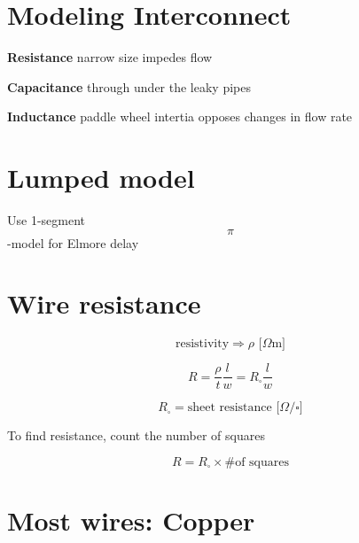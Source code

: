 \section{Modeling Interconnect}\label{modeling-interconnect}

\textbf{Resistance} narrow size impedes flow

\textbf{Capacitance} through under the leaky pipes

\textbf{Inductance} paddle wheel intertia opposes changes in flow rate

\section{Lumped model}\label{lumped-model}

Use 1-segment \[\pi\]-model for Elmore delay

\begin{Shaded}
\begin{Highlighting}[]
\ExtensionTok{{-}{-}{-}/\textbackslash{}/\textbackslash{}/\textbackslash{}{-}{-}{-}}
 \KeywordTok{|}        \KeywordTok{|}
\ExtensionTok{{-}{-}{-}}      \AttributeTok{{-}{-}{-}}
\ExtensionTok{{-}{-}{-}}      \AttributeTok{{-}{-}{-}} 
 \KeywordTok{|}        \KeywordTok{|}
\ExtensionTok{{-}{-}{-}}      \AttributeTok{{-}{-}{-}} 
 \ExtensionTok{{-}}        \AttributeTok{{-}}
\end{Highlighting}
\end{Shaded}

\section{Wire resistance}\label{wire-resistance}

\[ \text{resistivity} \Rightarrow \rho \text{ [} \Omega\text{m]} \]

\[ R = \frac{\rho}{t}\frac{l}{w} = R_\square \frac{l}{w} \]

\[ R_\square  = \text{sheet resistance [} \Omega/\square \text{]} \]

To find resistance, count the number of squares

\[ R = R_\square \times \text{\# of squares} \]

\section{Most wires: Copper}\label{most-wires-copper}

